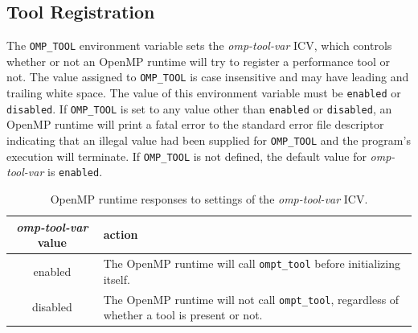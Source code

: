 \documentclass{article}
\begin{document}
\subsection{Tool Registration}
\label{sec:env}



The  \verb|OMP_TOOL| environment variable sets the {\em omp-tool-var} ICV, which controls whether or not an OpenMP 
runtime will try to register a performance tool or not. The value assigned to \verb|OMP_TOOL| is 
case insensitive and may have leading and trailing white space.  The value of
this environment variable must be \verb|enabled| or \verb|disabled|.   If  \verb|OMP_TOOL| is set to any value other than \verb|enabled| or \verb|disabled|, an OpenMP runtime will print a fatal error  to the standard error file descriptor indicating that an illegal value had been supplied for \verb|OMP_TOOL| and the program's execution will terminate. If \verb|OMP_TOOL| is not defined, the default value for  {\em omp-tool-var}  is  \verb|enabled|.



 \begin{table}
\begin{center}
\begin{tabular}{|c|p{4.5in}|}
\hline
 {\em omp-tool-var} value & action \\\hline
enabled & The OpenMP runtime will call  \verb|ompt_tool| before initializing itself.   \\\hline
disabled & The OpenMP runtime will not call  \verb|ompt_tool|, regardless of whether a tool is present or not.  \\\hline

\end{tabular}
\end{center}
\caption{OpenMP runtime responses to settings of the {\em omp-tool-var} ICV.}
\label{table:env-var}
\end{table}
\end{document}
